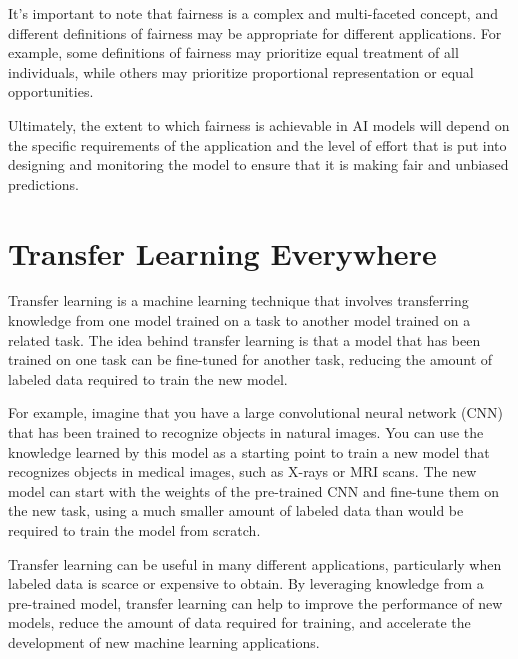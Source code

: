 It's important to note that fairness is a complex and multi-faceted concept, and different definitions of fairness may be appropriate for different applications. For example, some definitions of fairness may prioritize equal treatment of all individuals, while others may prioritize proportional representation or equal opportunities.

Ultimately, the extent to which fairness is achievable in AI models will depend on the specific requirements of the application and the level of effort that is put into designing and monitoring the model to ensure that it is making fair and unbiased predictions.

\section{Transfer Learning Everywhere}

Transfer learning is a machine learning technique that involves transferring knowledge from one model trained on a task to another model trained on a related task. The idea behind transfer learning is that a model that has been trained on one task can be fine-tuned for another task, reducing the amount of labeled data required to train the new model.

For example, imagine that you have a large convolutional neural network (CNN) that has been trained to recognize objects in natural images. You can use the knowledge learned by this model as a starting point to train a new model that recognizes objects in medical images, such as X-rays or MRI scans. The new model can start with the weights of the pre-trained CNN and fine-tune them on the new task, using a much smaller amount of labeled data than would be required to train the model from scratch.

Transfer learning can be useful in many different applications, particularly when labeled data is scarce or expensive to obtain. By leveraging knowledge from a pre-trained model, transfer learning can help to improve the performance of new models, reduce the amount of data required for training, and accelerate the development of new machine learning applications.

